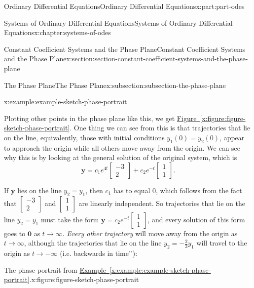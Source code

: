\documentclass[oneside,10pt,]{book}
\newcommand{\xreffont}{\relax}
\numberwithin{equation}{part}
\renewcommand{\vec}[1]{\mathbf{#1}}
\begin{document}
\begin{partptx}{Ordinary Differential Equations}{}{Ordinary Differential Equations}{}{}{x:part:part-odes}
\begin{chapterptx}{Systems of Ordinary Differential Equations}{}{Systems of Ordinary Differential Equations}{}{}{x:chapter:systems-of-odes}
\begin{sectionptx}{Constant Coefficient Systems and the Phase Plane}{}{Constant Coefficient Systems and the Phase Plane}{}{}{x:section:section-constant-coefficient-systems-and-the-phase-plane}
\begin{subsectionptx}{The Phase Plane}{}{The Phase Plane}{}{}{x:subsection:subsection-the-phase-plane}
\begin{example}{}{x:example:example-sketch-phase-portrait}
\par
Plotting other points in the phase plane like this, we get \hyperref[x:figure:figure-sketch-phase-portrait]{Figure~{\xreffont\ref{x:figure:figure-sketch-phase-portrait}}}. One thing we can see from this is that trajectories that lie on the line, equivalently, those with initial conditions \(y_{1}(0) = y_{2}(0)\), appear to approach the origin while all others move away from the origin. We can see why this is by looking at the general solution of the original system, which is%
\begin{equation*}
\vec{y} = c_{1}e^{4t}\begin{bmatrix}-3\\2\end{bmatrix}+c_{2}e^{-t}\begin{bmatrix}1\\1\end{bmatrix}.
\end{equation*}
%
\par
If \(\vec{y}\) lies on the line \(y_{2} = y_{1}\), then \(c_{1}\) has to equal \(0\), which follows from the fact that \(\begin{bmatrix}-3\\2\end{bmatrix}\) and \(\begin{bmatrix}1\\1\end{bmatrix}\) are linearly independent. So trajectories that lie on the line \(y_{2} = y_{1}\) must take the form \(\vec{y} = c_{2}e^{-t}\begin{bmatrix}1\\1\end{bmatrix}\), and every solution of this form goes to \(\vec{0}\) as \(t\to\infty\). \emph{Every other trajectory} will move away from the origin as \(t\to\infty\), although the trajectories that lie on the line \(y_{2} = -\frac{2}{3}y_{1}\) will travel to the origin as \(t\to-\infty\) (i.e. \textasciigrave{}\textasciigrave{}backwards in time'{}'{}):%
\end{example}
\begin{figureptx}{The phase portrait from \hyperref[x:example:example-sketch-phase-portrait]{Example~{\xreffont\ref{x:example:example-sketch-phase-portrait}}}.}{x:figure:figure-sketch-phase-portrait}{}%
\begin{image}{0.25}{0.5}{0.25}%

\end{image}
\end{figureptx}
\end{subsectionptx}
\end{sectionptx}
\end{chapterptx}
\end{partptx}
\end{document}
